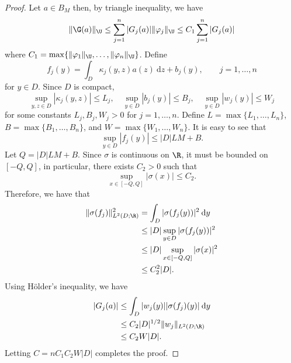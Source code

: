 {\begin{proof}
Let \(a \in B_M\) then, by triangle inequality, we have
\[\|\G(a)\|_\U \leq \sum_{j=1}^n |G_j(a)| \| \varphi_j\|_\U \leq C_1 \sum_{j=1}^n |G_j(a)| \]
where \(C_1 = \max \{\|\varphi_1\|_\U,\dots,\|\varphi_n\|_\U\}\). Define 
\[f_j (y) = \int_D \kappa_j(y,z) a(z) \: \text{d}z + b_j(y), \qquad j=1,\dots,n\]
for \(y \in D\). Since \(D\) is compact, 
\[\sup_{y,z \in D} |\kappa_j(y,z)| \leq L_j, \quad \sup_{y \in D} |b_j(y)| \leq B_j, \quad \sup_{y \in D} |w_j(y)| \leq W_j \]
for some constants \(L_j, B_j, W_j > 0\) for \(j=1,\dots,n\). Define \(L = \max \{L_1,\dots,L_n\}\), \(B = \max \{B_1,\dots,B_n\}\), and \(W = \max \{W_1,\dots,W_n\}\). It is easy to see that
\[\sup_{y \in D} |f_j(y)| \leq |D| L M + B.\]
Let \(Q = |D| L M + B\). Since \(\sigma\) is continuous on \(\R\), it must be bounded on \([-Q,Q]\), in particular, there exists \(C_2 > 0\) such that
\[\sup_{x \in [-Q,Q]} |\sigma(x)| \leq C_2.\]
Therefore, we have that
\begin{align*}
\|\sigma(f_j)\|_{L^2(D;\R)}^2 &= \int_D |\sigma (f_j(y))|^2 \: \text{d}y \\
&\leq |D| \sup_{y \in D} |\sigma (f_j(y))|^2 \\
&\leq |D| \sup_{x \in [-Q,Q]} |\sigma(x)|^2 \\
&\leq C_2^2 |D|.
\end{align*}
Using H{\"o}lder's inequality, we have
\begin{align*}
    |G_j(a)| &\leq \int_D |w_j(y)| |\sigma(f_j)(y)| \: \text{d}y \\
    &\leq C_2 |D|^{1/2} \|w_j\|_{L^2(D;\R)} \\
    &\leq C_2 W |D|.
\end{align*}
Letting \(C = nC_1 C_2 W |D|\) completes the proof.



\end{proof}}
